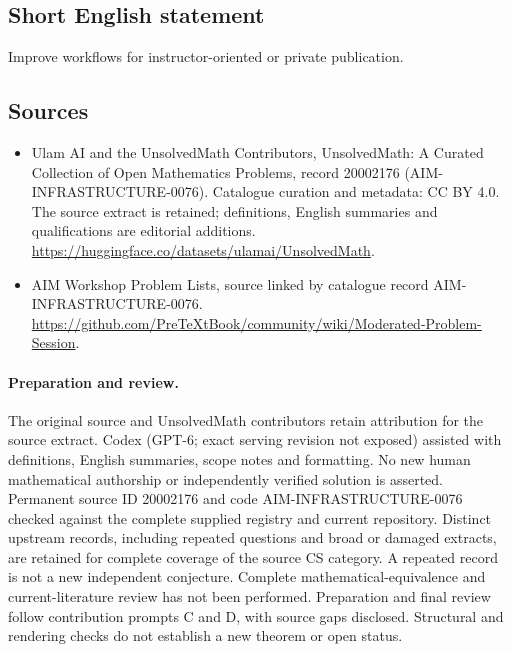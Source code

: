 \documentclass[11pt]{article}
\begin{document}
\subsection{Short English statement}
Improve workflows for instructor-oriented or private publication.
\subsection{Sources}
\begin{itemize}
\item[\hypertarget{source:20002176:1}{S1}] Ulam AI and the UnsolvedMath Contributors, UnsolvedMath: A Curated Collection of Open Mathematics Problems, record 20002176 (AIM-INFRASTRUCTURE-0076). Catalogue curation and metadata: CC BY 4.0. The source extract is retained; definitions, English summaries and qualifications are editorial additions.
\url{https://huggingface.co/datasets/ulamai/UnsolvedMath}.
\item[\hypertarget{source:20002176:2}{S2}] AIM Workshop Problem Lists, source linked by catalogue record AIM-INFRASTRUCTURE-0076.
\url{https://github.com/PreTeXtBook/community/wiki/Moderated-Problem-Session}.
\end{itemize}
\paragraph{Preparation and review.}
The original source and UnsolvedMath contributors retain attribution for the source extract. Codex (GPT-6; exact serving revision not exposed) assisted with definitions, English summaries, scope notes and formatting. No new human mathematical authorship or independently verified solution is asserted. Permanent source ID 20002176 and code AIM-INFRASTRUCTURE-0076 checked against the complete supplied registry and current repository. Distinct upstream records, including repeated questions and broad or damaged extracts, are retained for complete coverage of the source CS category. A repeated record is not a new independent conjecture. Complete mathematical-equivalence and current-literature review has not been performed. Preparation and final review follow contribution prompts C and D, with source gaps disclosed. Structural and rendering checks do not establish a new theorem or open status.
\label{end:20002176}
\end{document}
